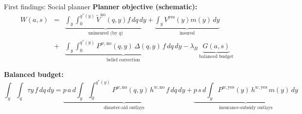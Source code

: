 \documentclass[xcolor=dvipsnames, aspectratio = 169]{beamer}
\begin{document}
{
\begin{frame}{First findings: Social planner}
\small
\textbf{Planner objective (schematic):}
\begin{eqnarray*}
    W(a,s)&=&
\underbrace{\int_y \int_0^{q^*(y)} \tilde V^{\text{no}}(q,y) f\,dq\,dy}_{\text{uninsured (by $q$)}}
+\underbrace{\int_y V^{\text{yes}}(y) m(y)\,dy}_{\text{insured}} \\
&+&\underbrace{\int_y \int_0^{q^*(y)} P^{w,\text{no}}(q,y)\,\Delta(q,y)\, f\,dq\,dy}_{\text{belief correction}}
-\lambda_B\, \underbrace{G(a,s)}_{\text{balanced budget}} 
\end{eqnarray*}


\textbf{Balanced budget:}
\[
\int_y\!\!\int_q \tau y\, f\,dq\,dy
=
\underbrace{p\,a\,d\!\int_y\!\!\int_0^{q^*(y)} \! P^{w,\text{no}}(q,y)\,h^{w,\text{no}}\, f\,dq\,dy}_{\text{disaster-aid outlays}}
+
\underbrace{p\,s\,d\!\int_y \! P^{w,\text{yes}}(y)\,h^{w,\text{yes}}\, m(y)\,dy}_{\text{insurance-subsidy outlays}}
\]
\end{frame}


}
\end{document}
